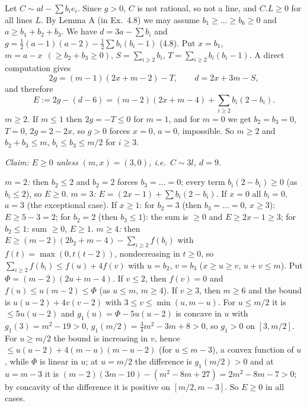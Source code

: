 \documentclass[11pt]{article}
\begin{document}
\pf
Let $C\sim al-\sum b_ie_i$. Since $g>0$, $C$ is not rational, so not a line, and $C.L\ge0$ for all lines $L$. By Lemma A (in Ex.~4.8) we may assume $b_1\ge\dots\ge b_6\ge0$ and $a\ge b_1+b_2+b_3$. We have $d=3a-\sum b_i$ and $g=\frac12(a-1)(a-2)-\frac12\sum b_i(b_i-1)$ (4.8). Put $x=b_1$, $m=a-x\ \ (\ge b_2+b_3\ge0)$, $S=\sum_{i\ge2}b_i$, $T=\sum_{i\ge2}b_i(b_i-1)$. A direct computation gives
\[
2g=(m-1)(2x+m-2)-T,\qquad d=2x+3m-S,
\]
and therefore
\[
E:=2g-(d-6)=(m-2)(2x+m-4)+\sum_{i\ge2}b_i(2-b_i).\tag{$**$}
\]
\emph{$m\ge2$.} If $m\le1$ then $2g=-T\le0$ for $m=1$, and for $m=0$ we get $b_2=b_3=0$, $T=0$, $2g=2-2x$, so $g>0$ forces $x=0$, $a=0$, impossible. So $m\ge2$ and $b_2+b_3\le m$, $b_i\le b_3\le m/2$ for $i\ge3$.

\emph{Claim: $E\ge0$ unless $(m,x)=(3,0)$, i.e.\ $C\sim3l$, $d=9$.}

\emph{$m=2$:} then $b_2\le2$ and $b_2=2$ forces $b_3=\dots=0$; every term $b_i(2-b_i)\ge0$ (as $b_i\le2$), so $E\ge0$.
\emph{$m=3$:} $E=(2x-1)+\sum b_i(2-b_i)$. If $x=0$ all $b_i=0$, $a=3$ (the exceptional case). If $x\ge1$: for $b_2=3$ (then $b_3=\dots=0$, $x\ge3$): $E\ge5-3=2$; for $b_2=2$ (then $b_3\le1$): the sum is $\ge0$ and $E\ge2x-1\ge3$; for $b_2\le1$: sum $\ge0$, $E\ge1$.
\emph{$m\ge4$:} then $E\ge(m-2)(2b_2+m-4)-\sum_{i\ge2}f(b_i)$ with $f(t)=\max(0,t(t-2))$, nondecreasing in $t\ge0$, so $\sum_{i\ge2}f(b_i)\le f(u)+4f(v)$ with $u=b_2$, $v=b_3$ ($x\ge u\ge v$, $u+v\le m$). Put $\Phi=(m-2)(2u+m-4)$. If $v\le2$, then $f(v)=0$ and $f(u)\le u(m-2)\le\Phi$ (as $u\le m$, $m\ge4$). If $v\ge3$, then $m\ge6$ and the bound is $u(u-2)+4v(v-2)$ with $3\le v\le\min(u,m-u)$. For $u\le m/2$ it is $\le5u(u-2)$ and $g_1(u)=\Phi-5u(u-2)$ is concave in $u$ with $g_1(3)=m^2-19>0$, $g_1(m/2)=\frac34m^2-3m+8>0$, so $g_1>0$ on $[3,m/2]$. For $u\ge m/2$ the bound is increasing in $v$, hence $\le u(u-2)+4(m-u)(m-u-2)$ (for $u\le m-3$), a convex function of $u$, while $\Phi$ is linear in $u$; at $u=m/2$ the difference is $g_1(m/2)>0$ and at $u=m-3$ it is $(m-2)(3m-10)-(m^2-8m+27)=2m^2-8m-7>0$; by concavity of the difference it is positive on $[m/2,m-3]$. So $E\ge0$ in all cases.
\end{document}
